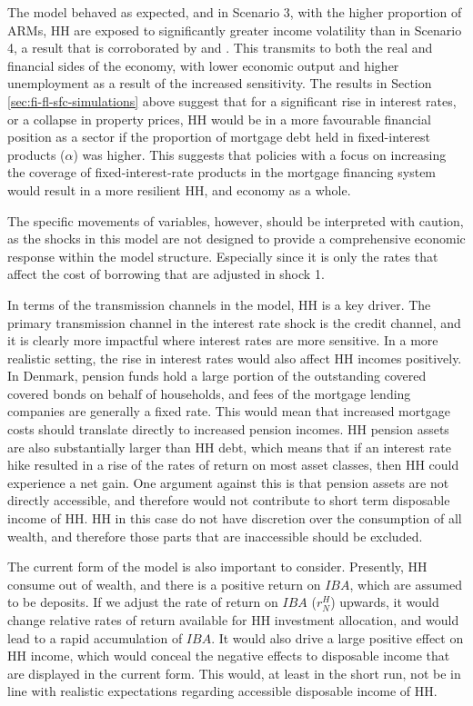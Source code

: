 \documentclass[
]{book}
\begin{document}
The model behaved as expected, and in Scenario 3, with the higher proportion of ARMs, HH are exposed to significantly greater income volatility than in Scenario 4, a result that is corroborated by \citet{DanmarksNationalbank2016a} and \citet{Skinhoj2019}. This transmits to both the real and financial sides of the economy, with lower economic output and higher unemployment as a result of the increased sensitivity. The results in Section \ref{sec:fi-fl-sfc-simulations} above suggest that for a significant rise in interest rates, or a collapse in property prices, HH would be in a more favourable financial position as a sector if the proportion of mortgage debt held in fixed-interest products (\(\alpha\)) was higher. This suggests that policies with a focus on increasing the coverage of fixed-interest-rate products in the mortgage financing system would result in a more resilient HH, and economy as a whole.

The specific movements of variables, however, should be interpreted with caution, as the shocks in this model are not designed to provide a comprehensive economic response within the model structure. Especially since it is only the rates that affect the cost of borrowing that are adjusted in shock 1.

In terms of the transmission channels in the model, HH is a key driver. The primary transmission channel in the interest rate shock is the credit channel, and it is clearly more impactful where interest rates are more sensitive. In a more realistic setting, the rise in interest rates would also affect HH incomes positively. In Denmark, pension funds hold a large portion of the outstanding covered covered bonds on behalf of households, and fees of the mortgage lending companies are generally a fixed rate. This would mean that increased mortgage costs should translate directly to increased pension incomes. HH pension assets are also substantially larger than HH debt, which means that if an interest rate hike resulted in a rise of the rates of return on most asset classes, then HH could experience a net gain. One argument against this is that pension assets are not directly accessible, and therefore would not contribute to short term disposable income of HH. HH in this case do not have discretion over the consumption of all wealth, and therefore those parts that are inaccessible should be excluded.

The current form of the model is also important to consider. Presently, HH consume out of wealth, and there is a positive return on \(IBA\), which are assumed to be deposits. If we adjust the rate of return on \(IBA\) (\(r^H_N\)) upwards, it would change relative rates of return available for HH investment allocation, and would lead to a rapid accumulation of \(IBA\). It would also drive a large positive effect on HH income, which would conceal the negative effects to disposable income that are displayed in the current form. This would, at least in the short run, not be in line with realistic expectations regarding accessible disposable income of HH.
\end{document}
